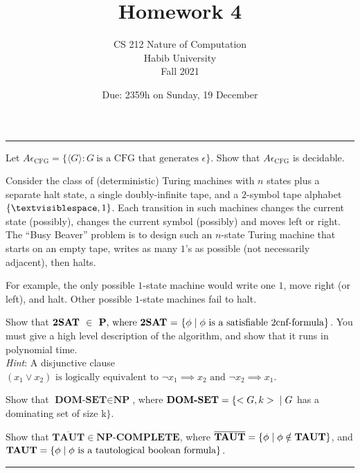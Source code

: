\documentclass[a4page]{exam}
\title{Homework 4}
\author{CS 212 Nature of Computation\\Habib University\\Fall 2021}
\date{Due: 2359h on Sunday, 19 December}
\begin{document}
\maketitle
\thispagestyle{empty}

\noindent\rule{\textwidth}{1pt}

\begin{questions}
\question[20] Let $A\epsilon_\text{CFG} = \{ \langle G \rangle : G\ \text{is a CFG that generates $\epsilon$}\}$. Show that $A\epsilon_\text{CFG}$ is decidable.

\question[20] Consider the class of (deterministic) Turing machines with $n$ states plus a separate halt state, a single doubly-infinite tape, and a $2$-symbol tape alphabet $\{\textvisiblespace, 1 \}$. Each transition in such machines changes the current state (possibly), changes the current symbol (possibly) and moves \textsf{left} or \textsf{right}. The ``Busy Beaver'' problem is to design such an $n$-state Turing machine that starts on an empty tape, writes as many $1$'s as possible (not necessarily adjacent), then halts.

  For example, the only possible $1$-state machine would write one $1$, move \textsf{right} (or \textsf{left}), and halt. Other possible $1$-state machines fail to halt.
  
\question[20] Show that $\textbf{2SAT } \in  \textbf{ P}\text{, where }\textbf{2SAT}\text{ = } \{ \phi \hspace{1mm} | \hspace{1mm} \phi \text{ is a satisfiable 2cnf-formula}\}$. You must give a high level description of the algorithm, and show that it runs in polynomial time. \\ \textit{Hint}: A disjunctive clause $(x_1 \vee x_2) \text{ is logically equivalent to } \neg x_1 \implies x_2 \text{ and } \neg x_2 \implies x_1$.
  
\question[20] Show that $\textbf{DOM-SET} \in \textbf{NP}$, where $\textbf{DOM-SET} = \{ <G,k> \hspace{1mm} | \hspace{1mm}  G$  has a dominating set of size k$\}$.
  
\question[20] Show that $\overline{\textbf{TAUT}} \in \textbf{NP-COMPLETE}$, where $\overline{\textbf{TAUT}}=\{\phi \hspace{1mm} | \hspace{1mm} \phi \notin \textbf{TAUT} \}$, and $\textbf{TAUT} = \{ \phi \hspace{1mm} | \hspace{1mm} \phi \text{ is a tautological boolean formula} \}$.

\end{questions}

\noindent\rule{\textwidth}{1pt}
\end{document}

